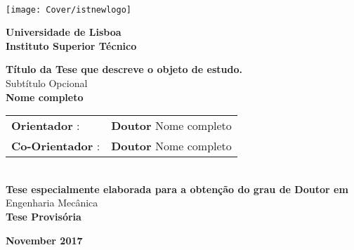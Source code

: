 \setcounter{page}{1} 


\thispagestyle{empty}
\begin{flushleft} ~\\ \vspace{-12mm} \hspace{-12mm}  \texttt{[image: Cover/istnewlogo]} 
 
\centering
\LARGE \textbf{Universidade de Lisboa \\ Instituto Superior Técnico}
\vspace{30mm}

 \vspace{5mm}
 
\centering
\LARGE \textbf{Título da Tese que descreve o objeto de estudo.}
\\ \vspace{10mm}
\Large Subtítulo Opcional
\\ \vspace{15mm}
\Large \textbf{Nome completo} \\
\vspace{4cm}

\begin{minipage}{\textwidth}
\begin{tabularx}{\textwidth}{ l @{ } l }
\large \textbf{Orientador} : & \textbf{Doutor} Nome completo\\
 \large \textbf{Co-Orientador} :  & \textbf{Doutor} Nome completo\\
\end{tabularx}

\end{minipage}
%
\\ \vspace{27mm}
\centering
\large \textbf{Tese especialmente elaborada para a obtenção do grau de Doutor em}\\
\large Engenharia Mecânica\\
\vspace{18mm}
\Large \textbf{Tese Provisória}
 
\vspace{15mm}

\large \textbf{November 2017} \\
\let\thepage\relax
\end{flushleft}
\pagebreak
